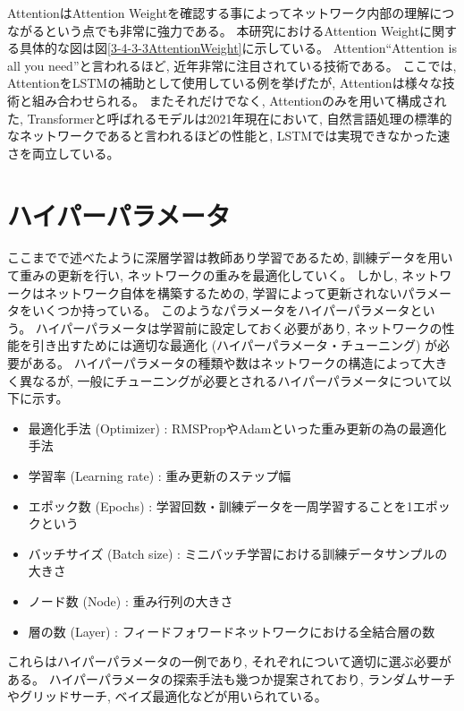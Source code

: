 AttentionはAttention Weightを確認する事によってネットワーク内部の理解につながるという点でも非常に強力である。
本研究におけるAttention Weightに関する具体的な図は図\ref{3-4-3-3AttentionWeight}に示している。
Attention``Attention is all you need\cite{AttentionIsAllYouNeed}''と言われるほど, 近年非常に注目されている技術である。
ここでは, AttentionをLSTMの補助として使用している例を挙げたが, Attentionは様々な技術と組み合わせられる。
またそれだけでなく, Attentionのみを用いて構成された, Transformerと呼ばれるモデルは2021年現在において, 自然言語処理の標準的なネットワークであると言われるほどの性能と, LSTMでは実現できなかった速さを両立している。


\section{ハイパーパラメータ} \label{DL:HyperParameter}

ここまでで述べたように深層学習は教師あり学習であるため, 訓練データを用いて重みの更新を行い, ネットワークの重みを最適化していく。
しかし, ネットワークはネットワーク自体を構築するための, 学習によって更新されないパラメータをいくつか持っている。
このようなパラメータをハイパーパラメータという。
ハイパーパラメータは学習前に設定しておく必要があり, ネットワークの性能を引き出すためには適切な最適化 (ハイパーパラメータ・チューニング) が必要がある。
ハイパーパラメータの種類や数はネットワークの構造によって大きく異なるが, 一般にチューニングが必要とされるハイパーパラメータについて以下に示す。

\begin{itemize}
  \item 最適化手法 (Optimizer) : RMSPropやAdamといった重み更新の為の最適化手法
  \item 学習率 (Learning rate) : 重み更新のステップ幅
  \item エポック数 (Epochs) : 学習回数・訓練データを一周学習することを1エポックという
  \item バッチサイズ (Batch size) : ミニバッチ学習における訓練データサンプルの大きさ
  \item ノード数 (Node) : 重み行列の大きさ
  \item 層の数 (Layer) : フィードフォワードネットワークにおける全結合層の数
\end{itemize}

これらはハイパーパラメータの一例であり, それぞれについて適切に選ぶ必要がある。
ハイパーパラメータの探索手法も幾つか提案されており, ランダムサーチやグリッドサーチ, ベイズ最適化などが用いられている。

